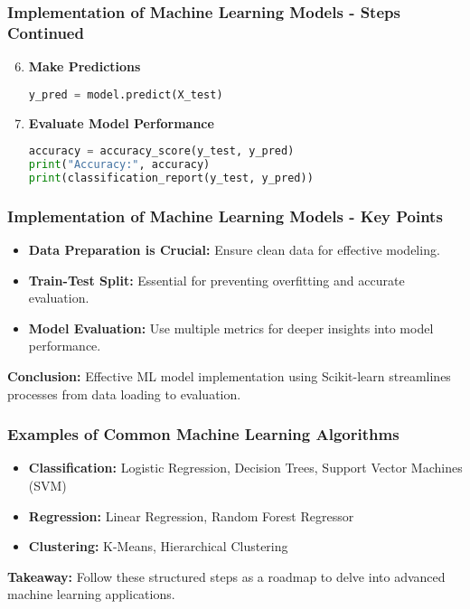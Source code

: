 \documentclass[aspectratio=169]{beamer}
\begin{document}
\begin{frame}[fragile]
    \frametitle{Implementation of Machine Learning Models - Steps Continued}
    \begin{enumerate}
        \setcounter{enumi}{5}
        \item \textbf{Make Predictions}
        \begin{lstlisting}[language=Python]
y_pred = model.predict(X_test)
        \end{lstlisting}

        \item \textbf{Evaluate Model Performance}
        \begin{lstlisting}[language=Python]
accuracy = accuracy_score(y_test, y_pred)
print("Accuracy:", accuracy)
print(classification_report(y_test, y_pred))
        \end{lstlisting}
    \end{enumerate}
\end{frame}

\begin{frame}
    \frametitle{Implementation of Machine Learning Models - Key Points}
    \begin{itemize}
        \item \textbf{Data Preparation is Crucial:} Ensure clean data for effective modeling.
        \item \textbf{Train-Test Split:} Essential for preventing overfitting and accurate evaluation.
        \item \textbf{Model Evaluation:} Use multiple metrics for deeper insights into model performance.
    \end{itemize}

    \textbf{Conclusion:} Effective ML model implementation using Scikit-learn streamlines processes from data loading to evaluation.
\end{frame}

\begin{frame}
    \frametitle{Examples of Common Machine Learning Algorithms}
    \begin{itemize}
        \item \textbf{Classification:} Logistic Regression, Decision Trees, Support Vector Machines (SVM)
        \item \textbf{Regression:} Linear Regression, Random Forest Regressor
        \item \textbf{Clustering:} K-Means, Hierarchical Clustering
    \end{itemize}
    
    \textbf{Takeaway:} Follow these structured steps as a roadmap to delve into advanced machine learning applications.
\end{frame}
\end{document}
